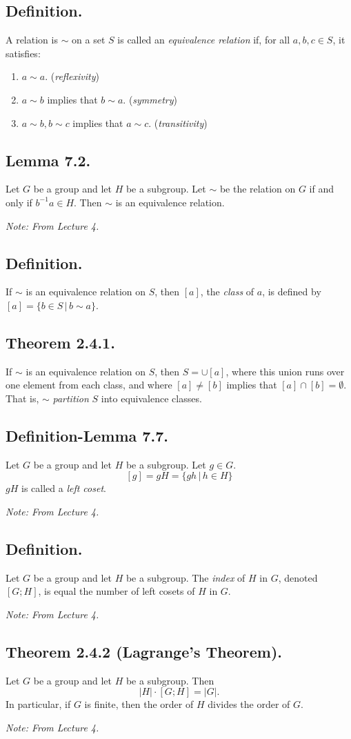 \documentclass{article}
\newenvironment{thm}[1]{\subsection*{Theorem #1.}}{}
\newenvironment{lemma}[1]{\subsection*{Lemma #1.}}{}
\newenvironment{defn}{\subsection*{Definition.}}{}
\newenvironment{defnlemma}[1]{\subsection*{Definition-Lemma #1.}}{}
\begin{document}
\begin{defn}
    A relation is $\sim$ on a set $S$ is called an \textit{equivalence relation} if, for all $a, b, c \in S$, it satisfies:
    \begin{enumerate}[label=(\alph*)]
        \item $a \sim a$. (\textit{reflexivity})
        \item $a \sim b$ implies that $b \sim a$. (\textit{symmetry})
        \item $a \sim b, b \sim c$ implies that $a \sim c$. (\textit{transitivity})
    \end{enumerate}
\end{defn}

\begin{lemma}{7.2}
    Let $G$ be a group and let $H$ be a subgroup. Let $\sim$ be the relation on $G$ if and only if $b^{-1}a \in H$. Then $\sim$ is an equivalence relation.

    \textit{Note: From Lecture 4.}
\end{lemma}

\begin{defn}
    If $\sim$ is an equivalence relation on $S$, then $[a]$, the \textit{class} of $a$, is defined by $[a] = \{b \in S \, | \, b \sim a\}$.
\end{defn}

\begin{thm}{2.4.1}
    If $\sim$ is an equivalence relation on $S$, then $S = \cup[a]$, where this union runs over one element from each class, and where $[a] \neq [b]$ implies that $[a] \cap [b] = \emptyset$. That is, $\sim$ \textit{partition} $S$ into equivalence classes.
\end{thm}

\begin{defnlemma}{7.7}
    Let $G$ be a group and let $H$ be a subgroup. Let $g \in G$.
    \[
        [g] = gH = \{gh \, | \, h \in H\}  
    \]
    $gH$ is called a \textit{left coset}.

    \textit{Note: From Lecture 4.}
\end{defnlemma}

\begin{defn}
    Let $G$ be a group and let $H$ be a subgroup. The \textit{index} of $H$ in $G$, denoted $[G; H]$, is equal the number of left cosets of $H$ in $G$.

    \textit{Note: From Lecture 4.}
\end{defn}

\begin{thm}{2.4.2 (Lagrange's Theorem)}
    Let $G$ be a group and let $H$ be a subgroup. Then
    \[
        |H| \cdot [G; H] = |G|.
    \]
    In particular, if $G$ is finite, then the order of $H$ divides the order of $G$.

    \textit{Note: From Lecture 4.}
\end{thm}
\end{document}
